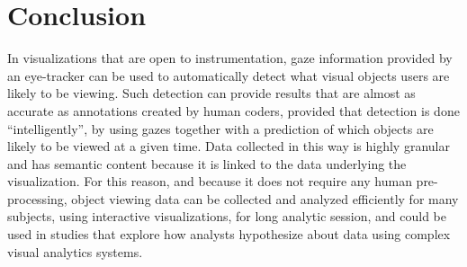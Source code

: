 
\section{Conclusion}
\label{sec:DOICollectionConclusion}
In visualizations that are open to instrumentation, gaze information provided by an eye-tracker can be used to automatically detect what visual objects users are likely to be viewing. Such detection can provide results that are almost as accurate as annotations created by human coders, provided that detection is done ``intelligently'', by using gazes together with a prediction of which objects are likely to be viewed at a given time. Data collected in this way is highly granular and has semantic content because it is linked to the data underlying the visualization. For this reason, and because it does not require any human pre-processing, object viewing data can be collected and analyzed efficiently for many subjects, using interactive visualizations, for long analytic session, and could be used in studies that explore how analysts hypothesize about data using complex visual analytics systems. 
